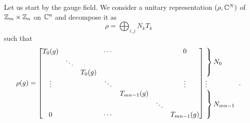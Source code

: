         Let us start by the gauge field. We consider a unitary representation $(\rho,\mathbb{C}^N)$ of $\mathbb{Z}_m\times \mathbb{Z}_n$ on $\mathbb{C}^n$ and decompose it as
        \begin{equation}
            \rho=\bigoplus_{i,j}N_k T_k
        \end{equation}
        such that
        \begin{equation}
            \rho(g)=
            \begin{bmatrix}
                T_0(g) & & & \cdots & & & 0 \\
                & \ddots & & & & & \\
                & & T_0(g) & & & &  \\
                \vdots & & & \ddots & & & \vdots \\
                & & & & T_{mn-1}(g) & & \\
                & & & & & \ddots & \\
                0 & & & \cdots & & & T_{mn-1}(g) 
            \end{bmatrix}
            \hspace{-0.2cm}
            \begin{tabular}{l}
            $\left.\lefteqn{\phantom{
                \begin{matrix}
                    a_0\\ \ddots\\ a_0\ 
                \end{matrix} 
            }}\right\}N_0$\\
            \vdots \\
            $\left.\lefteqn{\phantom{
                \begin{matrix}
                    b_0\\ \ddots\\ b_0\ 
                \end{matrix}
            }} \right\}N_{mn-1}$
            \end{tabular}.
        \end{equation}

